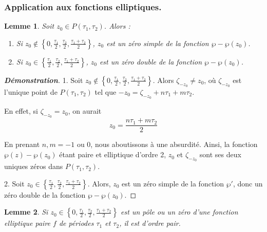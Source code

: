 \documentclass[12pt]{article}
\newtheorem{lemma}{Lemme}
\begin{document}
                    \subsubsection{Application aux fonctions elliptiques.}
                    \begin{lemma}
                    Soit \(z_0 \in P(\tau_1, \tau_2)\). Alors :
                    \begin{enumerate}
                        \item Si \(z_0 \notin \left\{ 0, \frac{\tau_1}{2}, \frac{\tau_2}{2}, \frac{\tau_1 + \tau_2}{2} \right\}\), \(z_0\) est un zéro simple de la fonction \(\wp - \wp(z_0)\).
                        \item Si \(z_0 \in \left\{ \frac{\tau_1}{2}, \frac{\tau_2}{2}, \frac{\tau_1 + \tau_2}{2} \right\}\), \(z_0\) est un zéro double de la fonction \(\wp - \wp(z_0)\).
                    \end{enumerate}
                    \end{lemma}

                    \begin{proof}[\textbf{Démonstration}]
                    1. Soit \(z_0 \notin \left\{ 0, \frac{\tau_1}{2}, \frac{\tau_2}{2}, \frac{\tau_1 + \tau_2}{2} \right\}\). Alors \(\zeta_{- z_0} \neq z_0\), où \(\zeta_{- z_0}\) est l'unique point de \(P(\tau_1, \tau_2)\) tel que \(-z_0 = \zeta_{- z_0} + n\tau_1 + m\tau_2\).

                    En effet, si $\zeta_{- z_0} = z_0$, on aurait
                    \[
                    z_0 = \frac{n\tau_1 + m\tau_2}{2}
                    \]

                    En prenant \(n, m = - 1\) ou 0, nous aboutissons à une absurdité. Ainsi, la fonction \(\wp(z) - \wp(z_0)\) étant paire et elliptique d'ordre 2, \(z_0\) et $\zeta_{- z_0}$ sont ses deux uniques zéros dans \(P(\tau_1, \tau_2)\).

                    2. Soit \(z_0 \in \left\{ \frac{\tau_1}{2}, \frac{\tau_2}{2}, \frac{\tau_1 + \tau_2}{2} \right\}\). Alors, \(z_0\) est un zéro simple de la fonction \(\wp'\), donc un zéro double de la fonction \(\wp - \wp(z_0)\).
                    \end{proof}

                    \begin{lemma}
                    Si \(z_0 \in \left\{ 0, \frac{\tau_1}{2}, \frac{\tau_2}{2}, \frac{\tau_1 + \tau_2}{2} \right\}\) est un pôle ou un zéro d'une fonction elliptique paire \(f\) de périodes \(\tau_1\) et \(\tau_2\), il est d'ordre pair.
                    \end{lemma}
\end{document}
